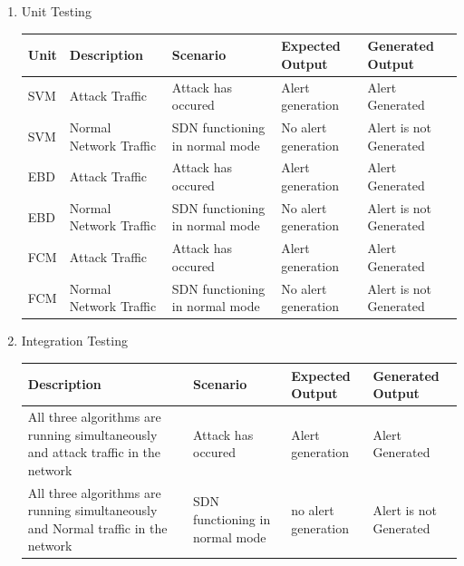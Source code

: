 \documentclass[12pt,a4paper,final]{report}
\begin{document}
\begin{enumerate}
\item\begin{flushleft}
Unit Testing 
\end{flushleft} 
	\begin{tabular}{|p{1cm}|p{3cm}|p{2.6cm}|p{2.5cm}|p{2.5cm}|}
	\hline 
	\textbf{Unit} & \textbf{Description} & \textbf{Scenario} & \textbf{Expected Output} & 		\textbf{Generated Output}\\ 
	\hline
	
	SVM & Attack Traffic & Attack has occured & Alert generation & Alert Generated\\
	\hline
	
	SVM & Normal Network Traffic & SDN functioning in normal mode & No alert generation & Alert is not Generated \\
	\hline
	
	EBD & Attack Traffic & Attack has occured & Alert generation & Alert Generated\\
	\hline
	
	EBD & Normal Network Traffic & SDN functioning in normal mode & No alert generation & Alert is not Generated \\
	\hline
	
	FCM & Attack Traffic & Attack has occured & Alert generation & Alert Generated\\
	\hline
	
	FCM & Normal Network Traffic & SDN functioning in normal mode & No alert generation & Alert is not Generated \\
	\hline
	
	\end{tabular}
	\linebreak
	
\item \begin{flushleft}
Integration Testing 
\end{flushleft} 
	\begin{tabular}{|p{3.5cm}|p{2.9cm}|p{2.5cm}|p{2.5cm}|}
	\hline 
	\textbf{Description} & \textbf{Scenario} & \textbf{Expected Output} & \textbf{Generated 		Output}\\ 
	\hline

	All three algorithms are running simultaneously and attack traffic in the network & Attack has occured & Alert generation & Alert Generated\\
	\hline
	
	All three algorithms are running simultaneously and Normal traffic in the network & SDN functioning in normal mode & no alert generation & Alert is not Generated\\
	\hline
	

\end{tabular}
\end{enumerate}
\end{document}
